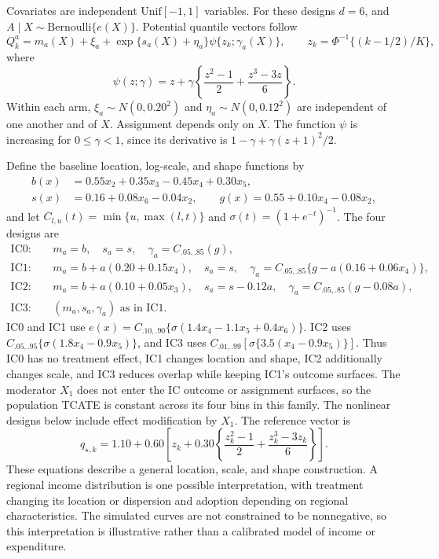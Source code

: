 \documentclass[11pt]{article}
\begin{document}
Covariates are independent $\mathrm{Unif}[-1,1]$ variables. For these designs $d=6$, and $A\mid X\sim\mathrm{Bernoulli}\{e(X)\}$. Potential quantile vectors follow
\begin{equation}\label{eq:dgp}
 Q_k^a=m_a(X)+\xi_a+\exp\{s_a(X)+\eta_a\}\psi\{z_k;\gamma_a(X)\},
 \qquad z_k=\Phi^{-1}\{(k-1/2)/K\},
\end{equation}
where
\[
 \psi(z;\gamma)=z+\gamma\left\{\frac{z^2-1}{2}+\frac{z^3-3z}{6}\right\}.
\]
Within each arm, $\xi_a\sim N(0,0.20^2)$ and $\eta_a\sim N(0,0.12^2)$ are independent of one another and of $X$. Assignment depends only on $X$. The function $\psi$ is increasing for $0\leq\gamma<1$, since its derivative is $1-\gamma+\gamma(z+1)^2/2$.

Define the baseline location, log-scale, and shape functions by
\begin{align*}
 b(x)&=0.55x_2+0.35x_3-0.45x_4+0.30x_5,\\
 s(x)&=0.16+0.08x_6-0.04x_2,\qquad
 g(x)=0.55+0.10x_4-0.08x_2,
\end{align*}
and let $C_{l,u}(t)=\min\{u,\max(l,t)\}$ and $\sigma(t)=(1+e^{-t})^{-1}$. The four designs are
\begin{align*}
\mathrm{IC0}:\quad &m_a=b,\quad s_a=s,\quad \gamma_a=C_{.05,.85}(g),\\
\mathrm{IC1}:\quad &m_a=b+a(0.20+0.15x_4),\quad s_a=s,\quad
 \gamma_a=C_{.05,.85}\{g-a(0.16+0.06x_4)\},\\
\mathrm{IC2}:\quad &m_a=b+a(0.10+0.05x_3),\quad s_a=s-0.12a,\quad
 \gamma_a=C_{.05,.85}(g-0.08a),\\
\mathrm{IC3}:\quad &(m_a,s_a,\gamma_a)\text{ as in IC1}.
\end{align*}
IC0 and IC1 use $e(x)=C_{.10,.90}\{\sigma(1.4x_4-1.1x_5+0.4x_6)\}$. IC2 uses $C_{.05,.95}\{\sigma(1.8x_4-0.9x_5)\}$, and IC3 uses $C_{.01,.99}[\sigma\{3.5(x_4-0.9x_5)\}]$. Thus IC0 has no treatment effect, IC1 changes location and shape, IC2 additionally changes scale, and IC3 reduces overlap while keeping IC1's outcome surfaces. The moderator $X_1$ does not enter the IC outcome or assignment surfaces, so the population TCATE is constant across its four bins in this family. The nonlinear designs below include effect modification by $X_1$. The reference vector is
\[
 q_{\star,k}=1.10+0.60\left[z_k+0.30\left\{\frac{z_k^2-1}{2}+\frac{z_k^3-3z_k}{6}\right\}\right].
\]
These equations describe a general location, scale, and shape construction. A regional income distribution is one possible interpretation, with treatment changing its location or dispersion and adoption depending on regional characteristics. The simulated curves are not constrained to be nonnegative, so this interpretation is illustrative rather than a calibrated model of income or expenditure.
\end{document}
